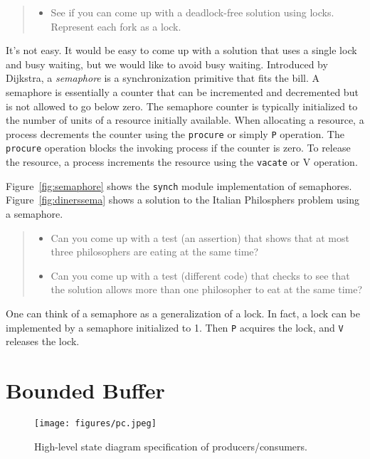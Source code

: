 \documentclass{report}
\begin{document}
\begin{quote}
\begin{itemize}
\item See if you can come up with a deadlock-free solution using locks.  Represent
    each fork as a lock.
\end{itemize}
\end{quote}

It's not easy.  It would be easy to come up with a solution that uses a single lock
and busy waiting, but we would like to avoid busy waiting.
Introduced by Dijkstra,
a \emph{semaphore} is a synchronization primitive that fits the bill.
A semaphore is essentially
a counter that can be incremented and decremented but is not allowed to go
below zero.  The semaphore counter is typically initialized to the number of
units of a resource initially available.
When allocating a resource, a process decrements the
counter using the \texttt{procure} or simply \texttt{P} operation.  The
\texttt{procure} operation blocks the invoking process if the counter is zero.
To release the resource, a process increments the resource using the
\texttt{vacate} or {V} operation.

Figure~\ref{fig:semaphore} shows the \texttt{synch} module implementation of
semaphores.
Figure~\ref{fig:dinerssema} shows a solution to the Italian Philosphers problem
using a semaphore.

\begin{quote}
\begin{itemize}
\item Can you come up with a test (an assertion) that shows that at most three
philosophers are eating at the same time?
\item Can you come up with a test (different code) that checks to see that
the solution allows more than one philosopher to eat at the same time?
\end{itemize}
\end{quote}

One can think of a semaphore as a generalization of a lock.  In fact, a
lock can be implemented by a semaphore initialized to 1.  Then \texttt{P}
acquires the lock, and \texttt{V} releases the lock.

\chapter{Bounded Buffer}

\begin{figure}
\begin{center}
\texttt{[image: figures/pc.jpeg]}
\end{center}
\caption{High-level state diagram specification of producers/consumers.}
\label{fig:pc}
\end{figure}
\end{document}
